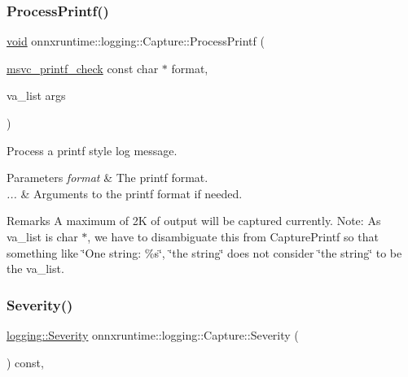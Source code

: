 \mbox{\label{classonnxruntime_1_1logging_1_1Capture_acd24ef8d8c31bb342f005baf595f3cc3}} 
\subsubsection{\texorpdfstring{Process\+Printf()}{ProcessPrintf()}}
{\footnotesize\ttfamily \mbox{\hyperlink{mlasi_8h_a88f941d423cb2a819b70a1358982b1a6}{void}} onnxruntime\+::logging\+::\+Capture\+::\+Process\+Printf (\begin{DoxyParamCaption}\item[{\mbox{\hyperlink{capture_8h_a7249ae45e189a29f562633e536a1042c}{msvc\+\_\+printf\+\_\+check}} const char $\ast$}]{format,  }\item[{va\+\_\+list}]{args }\end{DoxyParamCaption})}

Process a printf style log message. 
\begin{DoxyParams}{Parameters}
{\em format} & The printf format. \\
\hline
{\em ...} & Arguments to the printf format if needed. \\
\hline
\end{DoxyParams}
\begin{DoxyRemark}{Remarks}
A maximum of 2K of output will be captured currently. Note\+: As va\+\_\+list is \textquotesingle{}char $\ast$\textquotesingle{}, we have to disambiguate this from Capture\+Printf so that something like \char`\"{}\+One string\+: \%s\char`\"{}, \char`\"{}the string\char`\"{} does not consider \char`\"{}the string\char`\"{} to be the va\+\_\+list. 
\end{DoxyRemark}
\mbox{\label{classonnxruntime_1_1logging_1_1Capture_a647ba6b4406a1d5733e350e134da50fa}} 
\subsubsection{\texorpdfstring{Severity()}{Severity()}}
{\footnotesize\ttfamily \mbox{\hyperlink{namespaceonnxruntime_1_1logging_a7daeb33e1b0e6a6df8c23d142af78e81}{logging\+::\+Severity}} onnxruntime\+::logging\+::\+Capture\+::\+Severity (\begin{DoxyParamCaption}{ }\end{DoxyParamCaption}) const\hspace{0.3cm}{\ttfamily [inline]}, {\ttfamily [noexcept]}}

